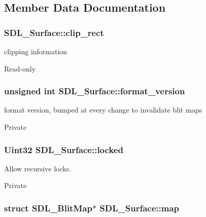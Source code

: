 \subsection{Member Data Documentation}
\subsubsection[{clip\+\_\+rect}]{ S\+D\+L\+\_\+\+Surface\+::clip\+\_\+rect}\label{struct_s_d_l___surface_aa9a0da3b38261dad6cf0cc4e3bb5b0c3}


clipping information 

Read-\/only 
\subsubsection[{format\+\_\+version}]{\setlength{\rightskip}{0pt plus 5cm}unsigned int S\+D\+L\+\_\+\+Surface\+::format\+\_\+version}\label{struct_s_d_l___surface_a71e84e52b2faf69be9739f97b248342a}


format version, bumped at every change to invalidate blit maps 

Private 
\subsubsection[{locked}]{\setlength{\rightskip}{0pt plus 5cm}Uint32 S\+D\+L\+\_\+\+Surface\+::locked}\label{struct_s_d_l___surface_ae807b7e4f4174d56e6cf40df12c8cefe}


Allow recursive locks. 

Private 
\subsubsection[{map}]{\setlength{\rightskip}{0pt plus 5cm}struct S\+D\+L\+\_\+\+Blit\+Map$\ast$ S\+D\+L\+\_\+\+Surface\+::map}\label{struct_s_d_l___surface_a8c1ecad399b0d4f525b1a53b6ee9393f}


